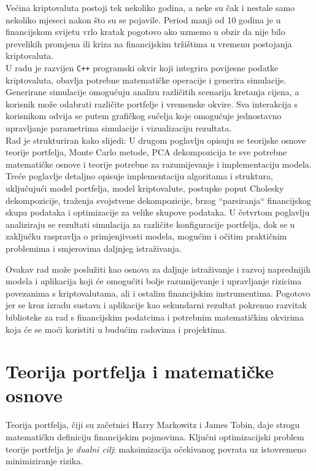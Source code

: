 \documentclass[zavrsnirad, upload]{fer}
\begin{document}
Većina kriptovaluta postoji tek nekoliko godina, a neke su čak i
nestale samo nekoliko mjeseci nakon što su se pojavile. Period manji od
10 godina je u financijskom svijetu vrlo kratak pogotovo ako uzmemo u obzir
da nije bilo prevelikih promjena ili kriza na financijskim tržištima
u vremenu postojanja kriptovaluta.\\
U radu je razvijen \texttt{C++} programski okvir koji integrira povijesne podatke
kriptovaluta, obavlja potrebne matematičke operacije i generira simulacije.
Generirane simulacije omogućuju analizu različitih scenarija kretanja cijena,
a korisnik može odabrati različite portfelje i vremenske okvire.
Sva interakcija s korisnikom odvija se putem grafičkog sučelja koje
omogućuje jednostavno upravljanje parametrima simulacije i vizualizaciju
rezultata.\\
Rad je strukturiran kako slijedi: U drugom poglavlju opisuju se teorijske
osnove teorije portfelja, Monte Carlo metode, PCA dekompozicija te
sve potrebne matematičke osnove i teorije potrebne za razumijevanje
i implementaciju modela.
Treće poglavlje detaljno opisuje implementaciju algoritama i struktura, uključujući
model portfelja, model kriptovalute, postupke poput Cholesky dekompozicije,
traženja svojstvene dekompozicije, brzog ``parsiranja`` financijskog skupa podataka
i optimizacije za velike skupove podataka.
U četvrtom poglavlju analiziraju se rezultati simulacija za različite
konfiguracije portfelja, dok se u zaključku raspravlja o primjenjivosti
modela, mogućim i očitim praktičnim problemima i smjerovima daljnjeg istraživanja.

Ovakav rad može poslužiti kao osnova za daljnje istraživanje i razvoj
naprednijih modela i aplikacija koji će omogućiti bolje razumijevanje i upravljanje
rizicima povezanima s kriptovalutama, ali i ostalim financijskim instrumentima.
Pogotovo jer se kroz izradu sustava i aplikacije kao sekundarni rezultat
pokrenuo razvitak biblioteke za rad s financijskim podatcima i potrebnim
matematičkim okvirima koja će se moći koristiti u budućim radovima i projektima.

\chapter{Teorija portfelja i matematičke osnove}
\label{pog:teorija_portelja}
Teorija portfelja, čiji su začetnici Harry Markowitz i James Tobin,
daje strogu matematičku definiciju financijskim pojmovima.
Ključni optimizacijski problem teorije portfelja je
\textit{dualni cilj}: maksimizacija očekivanog povrata
uz istovremeno minimiziranje rizika.
\end{document}
